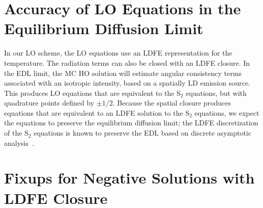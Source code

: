 

\section{Accuracy of LO Equations in the Equilibrium Diffusion Limit}
\label{sec:edl_overview}

In our LO scheme, the
LO equations use an LDFE representation for the temperature.  The radiation terms can also
be closed with an LDFE closure.  In the EDL limit, the MC HO
solution will estimate angular consistency terms associated with an isotropic intensity,
based on a spatially LD emission source.  This produces LO equations that are equivalent to
the S$_2$ equations, but with quadrature points defined by $\pm 1/2$.  Because the spatial closure produces equations that are equivalent to an LDFE
solution to the S$_2$ equations, we expect the equations to preserve the equilibrium diffusion
limit; the LDFE discretization of the S$_2$ equations is known to preserve the EDL based on discrete asymptotic analysis~\cite{morel_ldtrt}.

\section{Fixups for Negative Solutions with LDFE Closure}
\label{sec:ldfe_fixups}

